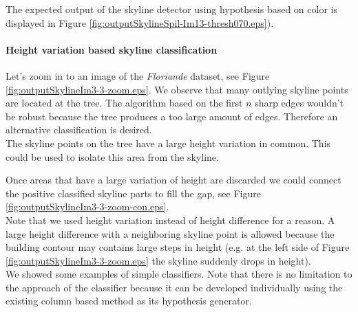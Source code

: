 The expected output of the skyline detector using hypothesis based on color is
displayed in Figure \ref{fig:outputSkylineSpil-Im13-thresh070.eps}). 

\paragraph{Height variation based skyline classification}
Let's zoom in to an image of the \emph{Floriande} dataset, see Figure \ref{fig:outputSkylineIm3-3-zoom.eps}.
We observe that many outlying skyline points are located at the tree.  The algorithm based on the
first $n$ sharp edges wouldn't be robust because the tree produces a too large
amount of edges. Therefore an alternative classification is desired.\\

The skyline points on the tree have a large height variation in common.
This could be used to isolate this area from the skyline.

Once areas that have a large variation of height are discarded we could connect
the positive classified skyline parts to fill the gap, see Figure
\ref{fig:outputSkylineIm3-3-zoom-con.eps}.\\

Note that we used height variation instead of height difference for a reason.  A
large height difference with a neighboring skyline point is allowed because the
building contour may contains large steps in height (e.g. at the left side of
Figure \ref{fig:outputSkylineIm3-3-zoom.eps} the skyline suddenly drops in
height).\\

We showed some examples of simple classifiers. Note that there is no limitation
to the approach of the classifier because it can be developed individually using
the existing column based method as its hypothesis generator.
\clearpage

\newpage
{}
\clearpage




